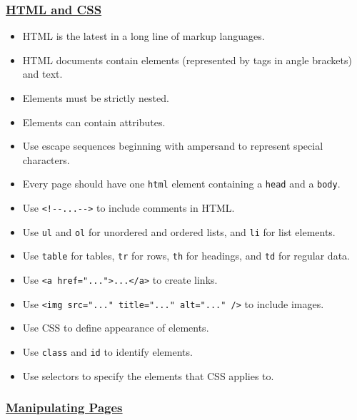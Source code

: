 \subsubsection{\texorpdfstring{\protect\hyperlink{s:htmlcss}{HTML and
CSS}}{HTML and CSS}}\label{null}

\begin{itemize}
\tightlist
\item
  HTML is the latest in a long line of markup languages.
\item
  HTML documents contain elements (represented by tags in angle
  brackets) and text.
\item
  Elements must be strictly nested.
\item
  Elements can contain attributes.
\item
  Use escape sequences beginning with ampersand to represent special
  characters.
\item
  Every page should have one \texttt{html} element containing a
  \texttt{head} and a \texttt{body}.
\item
  Use \texttt{\textless{}!-\/-...-\/-\textgreater{}} to include comments
  in HTML.
\item
  Use \texttt{ul} and \texttt{ol} for unordered and ordered lists, and
  \texttt{li} for list elements.
\item
  Use \texttt{table} for tables, \texttt{tr} for rows, \texttt{th} for
  headings, and \texttt{td} for regular data.
\item
  Use
  \texttt{\textless{}a\ href="..."\textgreater{}...\textless{}/a\textgreater{}}
  to create links.
\item
  Use
  \texttt{\textless{}img\ src="..."\ title="..."\ alt="..."\ /\textgreater{}}
  to include images.
\item
  Use CSS to define appearance of elements.
\item
  Use \texttt{class} and \texttt{id} to identify elements.
\item
  Use selectors to specify the elements that CSS applies to.
\end{itemize}

\subsubsection{\texorpdfstring{\protect\hyperlink{s:pages}{Manipulating
Pages}}{Manipulating Pages}}\label{null}

